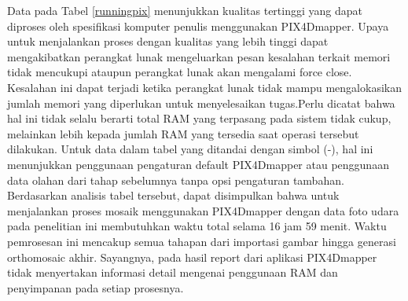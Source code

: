 Data pada Tabel \ref{runningpix} menunjukkan kualitas tertinggi yang dapat diproses oleh spesifikasi komputer penulis menggunakan PIX4Dmapper. Upaya untuk menjalankan proses dengan kualitas yang lebih tinggi dapat mengakibatkan perangkat lunak mengeluarkan pesan kesalahan terkait memori tidak mencukupi ataupun perangkat lunak akan mengalami force close. Kesalahan ini dapat terjadi ketika perangkat lunak tidak mampu mengalokasikan jumlah memori yang diperlukan untuk menyelesaikan tugas.Perlu dicatat bahwa hal ini tidak selalu berarti total RAM yang terpasang pada sistem tidak cukup, melainkan lebih kepada jumlah RAM yang tersedia saat operasi tersebut dilakukan. Untuk data dalam tabel yang ditandai dengan simbol (-), hal ini menunjukkan penggunaan pengaturan default PIX4Dmapper atau penggunaan data olahan dari tahap sebelumnya tanpa opsi pengaturan tambahan. Berdasarkan analisis tabel tersebut, dapat disimpulkan bahwa untuk menjalankan proses mosaik menggunakan PIX4Dmapper dengan data foto udara pada penelitian ini membutuhkan waktu total selama 16 jam 59 menit. Waktu pemrosesan ini mencakup semua tahapan dari importasi gambar hingga generasi orthomosaic akhir. Sayangnya, pada hasil report dari aplikasi PIX4Dmapper tidak menyertakan informasi detail mengenai penggunaan RAM dan penyimpanan pada setiap prosesnya.

